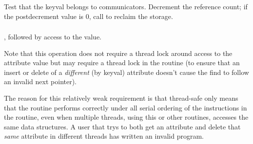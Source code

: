 \documentclass{article}
\begin{document}
\subsubsection{}
Test that the keyval belongs to communicators.  Decrement the
reference count; if the postdecrement value is 0, call
 to reclaim the storage.



\subsubsection{}
, followed by access to the value.

Note that this operation does not require a thread lock around access
to the attribute value but may require a thread lock in the
 routine (to ensure that an insert or delete of a
\emph{different} (by keyval) attribute doesn't cause the find to
follow an invalid next pointer).

The reason for this relatively weak requirement is that thread-safe
only means that the routine performs correctly under all serial
ordering of the instructions in the routine, even when multiple
threads, using this or other routines, accesses the same data
structures.  A user that trys to both get an attribute and delete that
\emph{same} attribute in different threads has written an invalid program.

\end{document}
